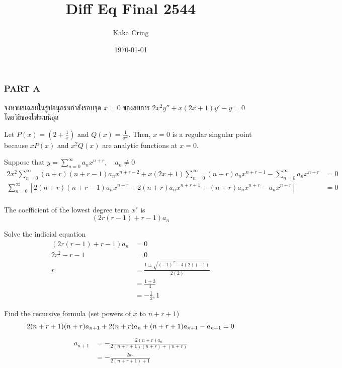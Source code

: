 \documentclass[12pt,final]{novelette} %
\title{Diff Eq Final 2544}
\author{Kaka Cring}
\date{\today}
\begin{document}

\subsubsection*{PART A}

\begin{question}
    \item {}
    จงหาผลเฉลยในรูปอนุกรมกำลังรอบจุด $x=0$ ของสมการ $2x^2y'' + x(2x+1)y' - y = 0$ โดยวิธีของโฟรเบนิอุส 

    \bigskip
    Let $P(x) = (2 + \frac1x)$ and $Q(x) = \frac1{x^2}$.
    Then, $x = 0$ is a regular singular point because $xP(x)$ and $x^2Q(x)$ are analytic functions at $x = 0$.

    \medskip
    Suppose that $\displaystyle y = \sum_{n=0}^\infty a_n x^{n+r}, \quad a_n \neq 0$
    \begin{align*}
        2 x^2 \sum_{n=0}^\infty (n+r)(n+r-1) a_n x^{n+r-2} + x(2x + 1) \sum_{n=0}^\infty (n+r) a_n x^{n+r-1} - \sum_{n=0}^\infty a_n x^{n+r} & = 0 \\
        \sum_{n=0}^\infty \left[ 2 (n+r)(n+r-1) a_n x^{n+r} + 2 (n+r) a_n x^{n+r+1} + (n+r) a_n x^{n+r} - a_n x^{n+r} \right]                & = 0 \\
    \end{align*}

    \vspace{-2em}

    The coefficient of the lowest degree term $x^r$ is
    $$
        (2r(r-1) + r - 1)a_n
    $$

    Solve the indicial equation
    \begin{align*}
        (2r(r-1) + r - 1)a_n & = 0                                           \\
        2r^2 - r - 1         & = 0                                           \\
        r                    & = \frac{1 \pm \sqrt{(-1)^2 - 4(2)(-1)}}{2(2)} \\
                             & = \frac{1 \pm 3}{4}                           \\
                             & = -\frac12, 1
    \end{align*}

    Find the recursive formula (set powers of $x$ to $n+r+1$)
    $$
        2 (n+r+1)(n+r) a_{n+1} + 2 (n+r) a_n + (n+r+1) a_{n+1} - a_{n+1} = 0                                                              \\
    $$
    \vspace*{-2em}
    \begin{align*}
        a_{n+1} & = -\frac{2(n+r) a_n}{2(n+r+1)(n+r) + (n+r)} \\
                & = - \frac{2 a_n}{2(n+r+1) + 1}
    \end{align*}


\end{question}
\end{document}
